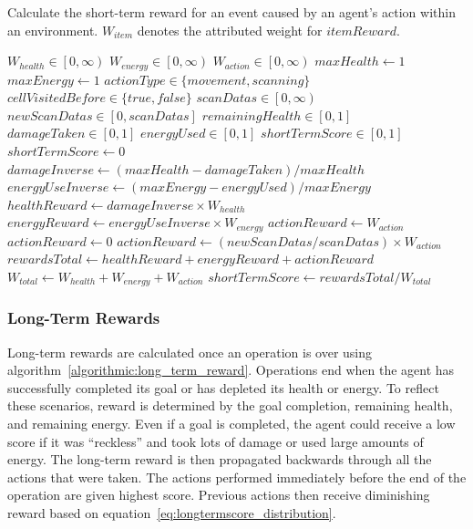 \begin{algorithm}
  \caption[Short-Term Reward Calculation]{Calculate the short-term reward for an event caused by an agent's action within an environment. $W_{item}$ denotes the attributed weight for $itemReward$.}
  \begin{algorithmic} \label{algorithmic:short_term_reward}
    \REQUIRE $W_{health} \in \left[0, \infty \right)$
    \REQUIRE $W_{energy} \in \left[0, \infty \right)$
    \REQUIRE $W_{action} \in \left[0, \infty \right)$
    \REQUIRE $maxHealth \leftarrow 1$
    \REQUIRE $maxEnergy \leftarrow 1$
    \REQUIRE $actionType \in \{movement, scanning\}$
    \REQUIRE $cellVisitedBefore \in \{true, false\}$
    \REQUIRE $scanDatas \in \left[0, \infty \right)$
    \REQUIRE $newScanDatas \in \left[0, scanDatas \right]$
    \REQUIRE $remainingHealth \in \left[0, 1 \right]$
    \REQUIRE $damageTaken \in \left[0, 1 \right]$
    \REQUIRE $energyUsed \in \left[0, 1 \right]$
    \ENSURE $shortTermScore \in \left[0, 1 \right]$
      \RETURN $shortTermScore \leftarrow 0$
    \ELSE
      \STATE $damageInverse \leftarrow (maxHealth - damageTaken) / maxHealth$
      \STATE $energyUseInverse \leftarrow (maxEnergy - energyUsed) / maxEnergy$
      \STATE $healthReward \leftarrow damageInverse \times W_{health}$
      \STATE $energyReward \leftarrow energyUseInverse \times W_{energy}$
          \STATE $actionReward \leftarrow W_{action}$
        \ELSE
          \STATE $actionReward \leftarrow 0$
        \ENDIF
      \ELSE
        \STATE $actionReward \leftarrow (newScanDatas / scanDatas) \times W_{action}$
      \ENDIF
      \STATE $rewardsTotal \leftarrow healthReward + energyReward + actionReward$
      \STATE $W_{total} \leftarrow W_{health} + W_{energy} + W_{action}$
      \RETURN $shortTermScore \leftarrow rewardsTotal / W_{total}$
    \ENDIF
  \end{algorithmic}
\end{algorithm}


\subsubsection{Long-Term Rewards}
Long-term rewards are calculated once an operation is over using algorithm~\ref{algorithmic:long_term_reward}.
Operations end when the agent has successfully completed its goal or has depleted its health or energy.
To reflect these scenarios, reward is determined by the goal completion, remaining health, and remaining energy.
Even if a goal is completed, the agent could receive a low score if it was ``reckless'' and took lots of damage or used large amounts of energy.
The long-term reward is then propagated backwards through all the actions that were taken.
The actions performed immediately before the end of the operation are given highest score.
Previous actions then receive diminishing reward based on equation~\ref{eq:longtermscore_distribution}.

